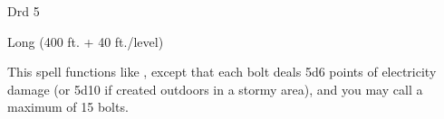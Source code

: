 
\begin{description*}
\item[Level:] Drd 5
\item[Range:] Long (400 ft. + 40 ft./level)
\end{description*}

This spell functions like , except that each bolt deals
5d6 points of electricity damage (or 5d10 if created outdoors in a stormy area),
and you may call a maximum of 15 bolts.